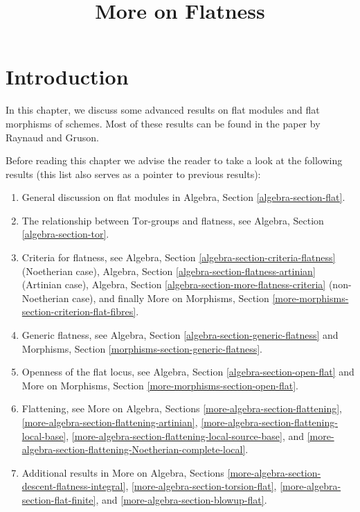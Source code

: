 

%


\title{More on Flatness}

\maketitle

\label{section-phantom}

\tableofcontents



\section{Introduction}
\label{section-introduction}

\noindent
In this chapter, we discuss some advanced results on flat modules and
flat morphisms of schemes. Most of these results can be
found in the paper \cite{GruRay} by Raynaud and Gruson.

\medskip\noindent
Before reading this chapter we advise the reader to take a look
at the following results (this list also serves as a pointer to
previous results):
\begin{enumerate}
\item General discussion on flat modules in
Algebra, Section \ref{algebra-section-flat}.
\item The relationship between $\text{Tor}$-groups and flatness, see
Algebra, Section \ref{algebra-section-tor}.
\item Criteria for flatness, see
Algebra, Section \ref{algebra-section-criteria-flatness}
(Noetherian case),
Algebra, Section \ref{algebra-section-flatness-artinian}
(Artinian case),
Algebra, Section \ref{algebra-section-more-flatness-criteria}
(non-Noetherian case), and finally
More on Morphisms, Section \ref{more-morphisms-section-criterion-flat-fibres}.
\item Generic flatness, see
Algebra, Section \ref{algebra-section-generic-flatness}
and
Morphisms, Section \ref{morphisms-section-generic-flatness}.
\item Openness of the flat locus, see
Algebra, Section \ref{algebra-section-open-flat}
and
More on Morphisms, Section \ref{more-morphisms-section-open-flat}.
\item Flattening, see
More on Algebra, Sections
\ref{more-algebra-section-flattening},
\ref{more-algebra-section-flattening-artinian},
\ref{more-algebra-section-flattening-local-base},
\ref{more-algebra-section-flattening-local-source-base}, and
\ref{more-algebra-section-flattening-Noetherian-complete-local}.
\item Additional results in
More on Algebra, Sections \ref{more-algebra-section-descent-flatness-integral},
\ref{more-algebra-section-torsion-flat},
\ref{more-algebra-section-flat-finite}, and
\ref{more-algebra-section-blowup-flat}.
\end{enumerate}







